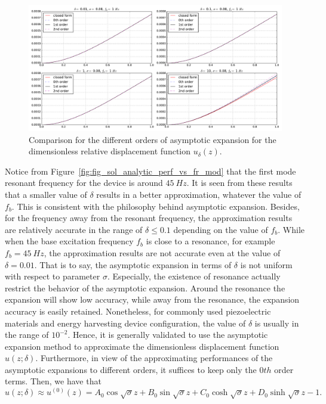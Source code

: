 \documentclass{article}
\begin{document}
\begin{figure}[!htbp]
    \centering
    \includegraphics[width=\textwidth]{./img_eig_asy/fig_sol_analytic_disp_cmp_fr001}
    \caption{Comparison for the different orders of asymptotic expansion for the dimensionless relative displacement function $u_\delta(z)$.}
    \label{fig:fig_sol_analytic_disp_cmp_fr001}
\end{figure}



Notice from Figure~\ref{fig:fig_sol_analytic_perf_vs_fr_mod} that the first mode resonant frequency for the device is around $45\ Hz$. It is seen from these results that a smaller value of $\delta$ results in a better approximation, whatever the value of $f_b$. This is consistent with the philosophy behind asymptotic expansion. Besides, for the frequency away from the resonant frequency, the approximation results are relatively accurate in the range of $\delta \leq 0.1$ depending on the value of $f_b$. While when the base excitation frequency $f_b$ is close to a resonance, for example $f_b = 45\ Hz$, the approximation results are not accurate even at the value of $\delta = 0.01$. That is to say, the asymptotic expansion in terms of $\delta$ is not uniform with respect to parameter $\sigma$. Especially, the existence of resonance actually restrict the behavior of the asymptotic expansion. Around the resonance the expansion will show low accuracy, while away from the resonance, the expansion accuracy is easily retained. Nonetheless, for commonly used piezoelectric materials and energy harvesting device configuration, the value of $\delta$ is usually in the range of $10^{-2}$. Hence, it is generally validated to use the asymptotic expansion method to approximate the dimensionless displacement function $u(z;\delta)$. Furthermore, in view of the approximating performances of the asymptotic expansions to different orders, it suffices to keep only the $0th$ order terms. Then, we have that 
\begin{equation}
    u(z;\delta) \approx u^{(0)}(z) = A_0 \cos{\sqrt{\sigma}z} + B_0 \sin{\sqrt{\sigma}z} + C_0 \cosh{\sqrt{\sigma}z} + D_0 \sinh{\sqrt{\sigma}z} - 1.
\end{equation}
\end{document}
